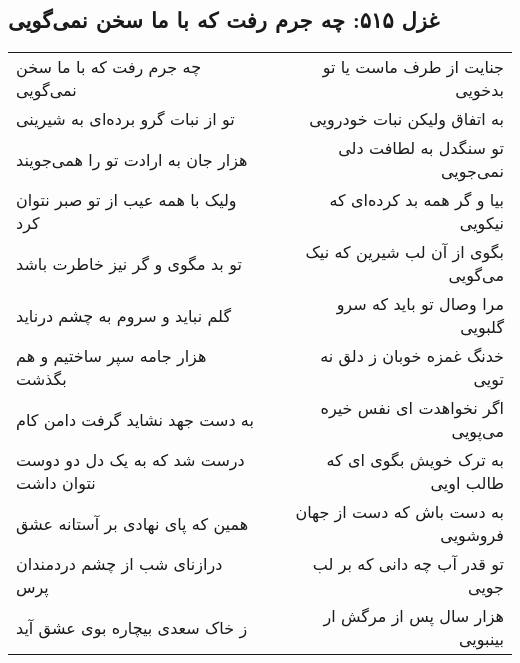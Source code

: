 \begin{center}
\section*{غزل ۵۱۵: چه جرم رفت که با ما سخن نمی‌گویی}
\label{sec:515}
\begin{longtable}{l p{0.5cm} r}
چه جرم رفت که با ما سخن نمی‌گویی
&&
جنایت از طرف ماست یا تو بدخویی
\\
تو از نبات گرو برده‌ای به شیرینی
&&
به اتفاق ولیکن نبات خودرویی
\\
هزار جان به ارادت تو را همی‌جویند
&&
تو سنگدل به لطافت دلی نمی‌جویی
\\
ولیک با همه عیب از تو صبر نتوان کرد
&&
بیا و گر همه بد کرده‌ای که نیکویی
\\
تو بد مگوی و گر نیز خاطرت باشد
&&
بگوی از آن لب شیرین که نیک می‌گویی
\\
گلم نباید و سروم به چشم درناید
&&
مرا وصال تو باید که سرو گلبویی
\\
هزار جامه سپر ساختیم و هم بگذشت
&&
خدنگ غمزه خوبان ز دلق نه تویی
\\
به دست جهد نشاید گرفت دامن کام
&&
اگر نخواهدت ای نفس خیره می‌پویی
\\
درست شد که به یک دل دو دوست نتوان داشت
&&
به ترک خویش بگوی ای که طالب اویی
\\
همین که پای نهادی بر آستانه عشق
&&
به دست باش که دست از جهان فروشویی
\\
درازنای شب از چشم دردمندان پرس
&&
تو قدر آب چه دانی که بر لب جویی
\\
ز خاک سعدی بیچاره بوی عشق آید
&&
هزار سال پس از مرگش ار بینبویی
\\
\end{longtable}
\end{center}
